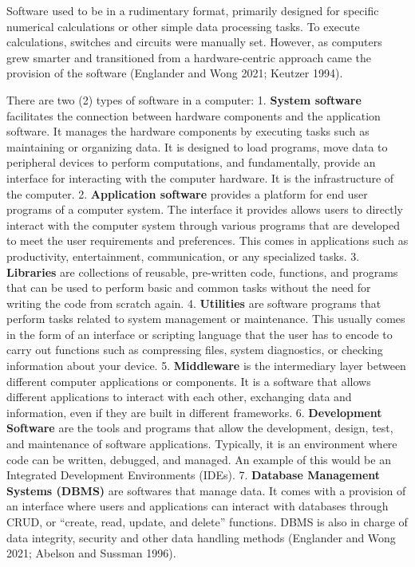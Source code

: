 \documentclass[
  letterpaper,
  DIV=11,
  numbers=noendperiod]{scrreprt}
\begin{document}
Software used to be in a rudimentary format, primarily designed for
specific numerical calculations or other simple data processing tasks.
To execute calculations, switches and circuits were manually set.
However, as computers grew smarter and transitioned from a
hardware-centric approach came the provision of the software (Englander
and Wong 2021; Keutzer 1994).

There are two (2) types of software in a computer: 1. \textbf{System
software} facilitates the connection between hardware components and the
application software. It manages the hardware components by executing
tasks such as maintaining or organizing data. It is designed to load
programs, move data to peripheral devices to perform computations, and
fundamentally, provide an interface for interacting with the computer
hardware. It is the infrastructure of the computer. 2.
\textbf{Application software} provides a platform for end user programs
of a computer system. The interface it provides allows users to directly
interact with the computer system through various programs that are
developed to meet the user requirements and preferences. This comes in
applications such as productivity, entertainment, communication, or any
specialized tasks. 3. \textbf{Libraries} are collections of reusable,
pre-written code, functions, and programs that can be used to perform
basic and common tasks without the need for writing the code from
scratch again. 4. \textbf{Utilities} are software programs that perform
tasks related to system management or maintenance. This usually comes in
the form of an interface or scripting language that the user has to
encode to carry out functions such as compressing files, system
diagnostics, or checking information about your device. 5.
\textbf{Middleware} is the intermediary layer between different computer
applications or components. It is a software that allows different
applications to interact with each other, exchanging data and
information, even if they are built in different frameworks. 6.
\textbf{Development Software} are the tools and programs that allow the
development, design, test, and maintenance of software applications.
Typically, it is an environment where code can be written, debugged, and
managed. An example of this would be an Integrated Development
Environments (IDEs). 7. \textbf{Database Management Systems (DBMS)} are
softwares that manage data. It comes with a provision of an interface
where users and applications can interact with databases through CRUD,
or ``create, read, update, and delete'' functions. DBMS is also in
charge of data integrity, security and other data handling methods
(Englander and Wong 2021; Abelson and Sussman 1996).
\end{document}
